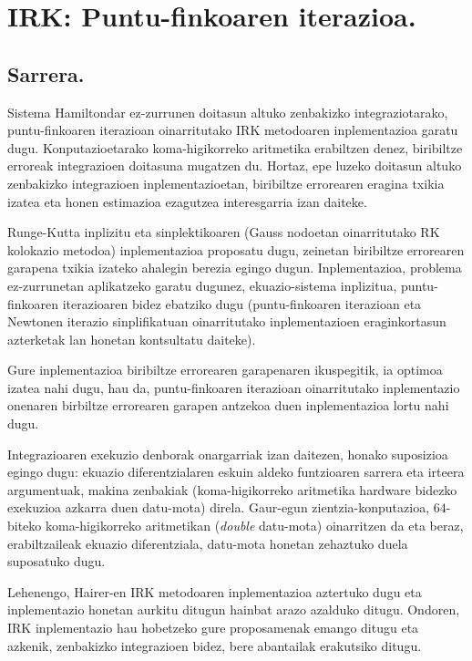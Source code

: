 \chapter{IRK: Puntu-finkoaren iterazioa.}
\label{chap:IRK-PF}

\section{Sarrera.}


Sistema Hamiltondar ez-zurrunen doitasun altuko zenbakizko integraziotarako, puntu-finkoaren iterazioan oinarritutako IRK metodoaren inplementazioa garatu dugu. Konputazioetarako koma-higikorreko aritmetika erabiltzen denez, biribiltze erroreak integrazioen doitasuna mugatzen du. Hortaz, epe luzeko doitasun altuko zenbakizko integrazioen inplementazioetan, biribiltze errorearen eragina txikia izatea eta honen estimazioa ezagutzea interesgarria izan daiteke. 

Runge-Kutta inplizitu eta sinplektikoaren (Gauss nodoetan oinarritutako RK kolokazio metodoa) inplementazioa proposatu dugu, zeinetan biribiltze errorearen garapena txikia izateko ahalegin berezia egingo dugun. Inplementazioa, problema ez-zurrunetan aplikatzeko garatu dugunez, ekuazio-sistema inplizitua, puntu-finkoaren iterazioaren bidez ebatziko dugu (puntu-finkoaren iterazioan eta Newtonen iterazio sinplifikatuan oinarritutako inplementazioen eraginkortasun azterketak lan honetan \cite{Hairer2006} kontsultatu daiteke).

Gure inplementazioa biribiltze errorearen garapenaren ikuspegitik, ia optimoa izatea nahi dugu, hau da, puntu-finkoaren iterazioan oinarritutako inplementazio onenaren birbiltze errorearen garapen antzekoa duen inplementazioa lortu nahi dugu. 

Integrazioaren exekuzio denborak onargarriak izan daitezen, honako suposizioa egingo dugu: ekuazio diferentzialaren eskuin aldeko funtzioaren sarrera eta irteera argumentuak, makina zenbakiak (koma-higikorreko aritmetika hardware bidezko exekuzioa azkarra duen datu-mota) direla. Gaur-egun zientzia-konputazioa,  $64$-biteko koma-higikorreko aritmetikan (\emph{double} datu-mota) oinarritzen da eta beraz, erabiltzaileak ekuazio diferentziala, datu-mota honetan zehaztuko duela suposatuko dugu. 
 
Lehenengo, Hairer-en IRK metodoaren inplementazioa  \cite{Hairer2008} aztertuko dugu eta inplementazio honetan aurkitu ditugun hainbat arazo azalduko ditugu. Ondoren, IRK inplementazio hau hobetzeko gure proposamenak emango ditugu eta azkenik, zenbakizko integrazioen bidez, bere abantailak erakutsiko ditugu.

